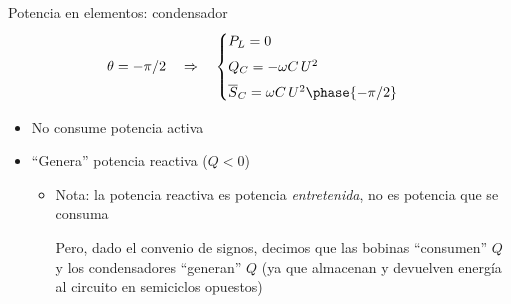 \documentclass[aspectratio=169, usenames,svgnames,dvipsnames]{beamer}
\begin{document}
\begin{frame}{Potencia en elementos: \hspace{3mm}condensador}
    \[
    \theta = - \pi/2 \quad \Rightarrow \quad 
    \begin{cases}
      P_L = 0\\[4pt]
      Q_C = - \omega C\, U^2\\[4pt]
      \overline{S}_C = \omega C \, U^2 \phase{-\pi/2}
    \end{cases}
    \]
    
    \begin{itemize}
        \item No consume potencia activa
        
        \vspace{2mm}
        \item ``Genera'' potencia reactiva (\(Q < 0\))

        \vspace{2mm}
        \begin{itemize}
            \item {\normalsize \alert{Nota}: la potencia reactiva es potencia \textit{entretenida}, no es potencia que se consuma}

            \vspace{2mm}
            {\normalsize Pero, dado el convenio de signos, decimos que \alert{las bobinas ``consumen'' $Q$} y \alert{los condensadores ``generan'' $Q$} (ya que almacenan y devuelven energía al circuito en semiciclos opuestos)}
        \end{itemize}
    \end{itemize}
\end{frame}

\end{document}
